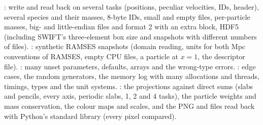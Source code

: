 \begin{validation}
: write and read back on several tasks (positions, peculiar velocities, IDs, header), several species and their
masses, 8-byte IDs, small and empty files, per-particle masses, big- and little-endian files and format 2 with an extra block, HDF5 (including
SWIFT's three-element box size and snapshots with different numbers of files). : synthetic RAMSES snapshots
(domain reading, units for both Mpc conventions of RAMSES, empty CPU files, a particle at $x=1$, the descriptor file). :
many unset parameters, defaults, arrays and the wrong-type errors. :  edge cases, the random generators,
the memory log with many allocations and threads, timings,  types and the unit systems.
: the projections against direct sums (slabs and pencils, every axis, periodic slabs, 1, 2 and
4 tasks), the particle weights and mass conservation, the colour maps and scales, and the PNG and  files read
back with Python's standard library (every pixel compared).
\end{validation}
